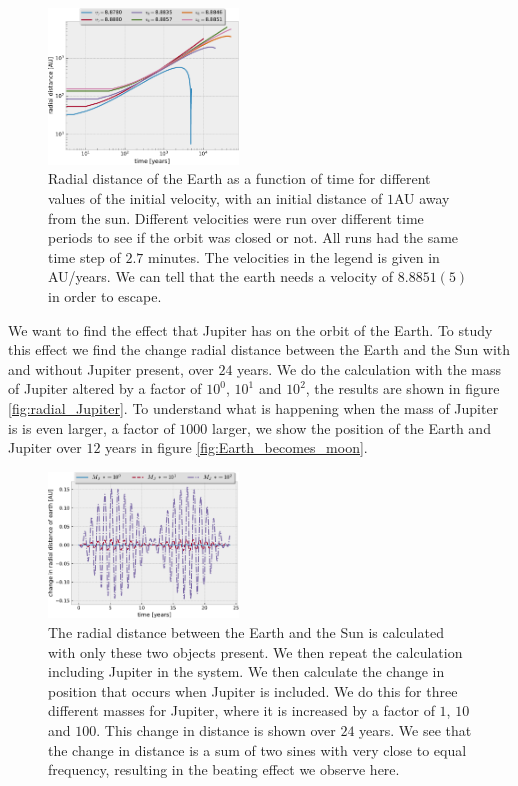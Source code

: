 \documentclass[%
 reprint,
nofootinbib,
aps,
]{revtex4-1}
\begin{document}
\begin{figure}
  \centering
  \includegraphics[width=0.45\textwidth]{../figures/escape_velocity.pdf}
  \caption{Radial distance of the Earth as a function of time for different values of the initial velocity, with an initial distance of $1$AU away from the sun. Different velocities were run over different time periods to see if the orbit was closed or not. All runs had the same time step of $2.7$ minutes. The velocities in the legend is given in AU/years. We can tell that the earth needs a velocity of $8.8851(5)$ in order to escape.}
  \label{fig:escape_velocity}
\end{figure}

We want to find the effect that Jupiter has on the orbit of the Earth. To study this effect we find the change radial distance between the Earth and the Sun with and without Jupiter present, over $24$ years. We do the calculation with the mass of Jupiter altered by a factor of $10^{0}$, $10^{1}$ and $10^{2}$, the results are shown in figure \vref{fig:radial_Jupiter}. To understand what is happening when the mass of Jupiter is is even larger, a factor of $1000$ larger, we show the position of the Earth and Jupiter over $12$ years in figure \vref{fig:Earth_becomes_moon}.

\begin{figure}
  \centering
  \includegraphics[width=0.45\textwidth]{../figures/radial_distance_jupiter.pdf}
  \caption{The radial distance between the Earth and the Sun is calculated with only these two objects present. We then repeat the calculation including Jupiter in the system. We then calculate the change in position that occurs when Jupiter is included. We do this for three different masses for Jupiter, where it is increased by a factor of $1$, $10$ and $100$. This change in distance is shown over $24$ years. We see that the change in distance is a sum of two sines with very close to equal frequency, resulting in the beating effect we observe here.}
  \label{fig:radial_Jupiter}
\end{figure}
\end{document}
